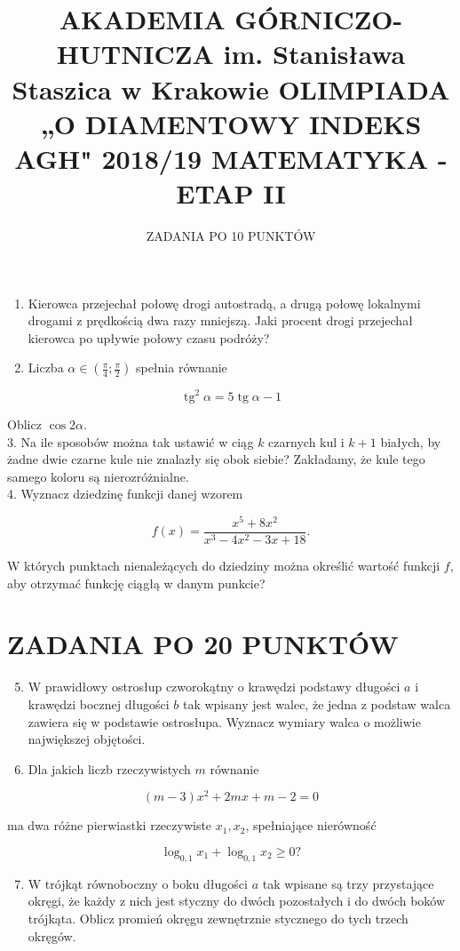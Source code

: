 \documentclass[10pt]{article}
\title{AKADEMIA GÓRNICZO-HUTNICZA im. Stanisława Staszica w Krakowie OLIMPIADA „O DIAMENTOWY INDEKS AGH" 2018/19 MATEMATYKA - ETAP II }
\author{ZADANIA PO 10 PUNKTÓW}
\date{}
\begin{document}
\maketitle


\begin{enumerate}
  \item Kierowca przejechał połowę drogi autostradą, a drugą połowę lokalnymi drogami z prędkością dwa razy mniejszą. Jaki procent drogi przejechał kierowca po upływie połowy czasu podróży?
  \item Liczba $\alpha \in\left(\frac{\pi}{4} ; \frac{\pi}{2}\right)$ spełnia równanie
\end{enumerate}

$$
\operatorname{tg}^{2} \alpha=5 \operatorname{tg} \alpha-1
$$

Oblicz $\cos 2 \alpha$.\\
3. Na ile sposobów można tak ustawić w ciąg $k$ czarnych kul i $k+1$ białych, by żadne dwie czarne kule nie znalazły się obok siebie? Zakładamy, że kule tego samego koloru są nierozróżnialne.\\
4. Wyznacz dziedzinę funkcji danej wzorem

$$
f(x)=\frac{x^{5}+8 x^{2}}{x^{3}-4 x^{2}-3 x+18} .
$$

W których punktach nienależących do dziedziny można określić wartość funkcji $f$, aby otrzymać funkcję ciągłą w danym punkcie?

\section*{ZADANIA PO 20 PUNKTÓW}
\begin{enumerate}
  \setcounter{enumi}{4}
  \item W prawidłowy ostrosłup czworokątny o krawędzi podstawy długości $a$ i krawędzi bocznej długości $b$ tak wpisany jest walec, że jedna z podstaw walca zawiera się w podstawie ostrosłupa. Wyznacz wymiary walca o możliwie największej objętości.
  \item Dla jakich liczb rzeczywistych $m$ równanie
\end{enumerate}

$$
(m-3) x^{2}+2 m x+m-2=0
$$

ma dwa różne pierwiastki rzeczywiste $x_{1}, x_{2}$, spełniające nierówność

$$
\log _{0,1} x_{1}+\log _{0,1} x_{2} \geqslant 0 ?
$$

\begin{enumerate}
  \setcounter{enumi}{6}
  \item W trójkąt równoboczny o boku długości $a$ tak wpisane są trzy przystające okręgi, że każdy z nich jest styczny do dwóch pozostałych i do dwóch boków trójkąta. Oblicz promień okręgu zewnętrznie stycznego do tych trzech okręgów.
\end{enumerate}
\end{document}

